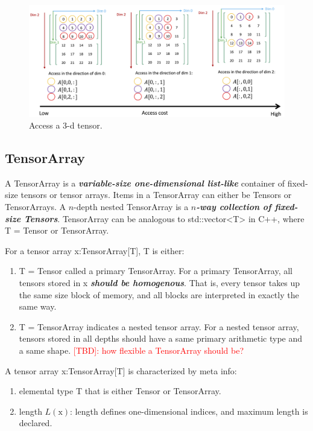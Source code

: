\begin{figure}[htbp]
\centering
\includegraphics[width=1.\textwidth]{images/tensor.png}
\caption{Access a 3-d tensor.}
\label{fig1}
\end{figure}

\subsection{TensorArray}

A TensorArray is a \textbf{\textit{variable-size one-dimensional list-like}} container of fixed-size tensors or tensor arrays. Items in a TensorArray can either be Tensors or TensorArrays. A $n$-depth nested TensorArray is a \textbf{\textit{$n$-way collection of fixed-size Tensors}}. TensorArray can be analogous to std::vector<T> in C++, where T = Tensor or TensorArray.

For a tensor array x:TensorArray[T], T is either:

\begin{enumerate}
  \item T = Tensor called a primary TensorArray. For a primary TensorArray, all tensors stored in x \textbf{\textit{should be homogenous}}. That is, every tensor takes up the same size block of memory, and all blocks are interpreted in exactly the same way.
  \item T = TensorArray indicates a nested tensor array. For a nested tensor array, tensors stored in all depths should have a same primary arithmetic type and a same shape. \textcolor{red}{[TBD]: how flexible a TensorArray should be?}
\end{enumerate}

A tensor array x:TensorArray[T] is characterized by meta info:
\begin{enumerate}
  \item elemental type T that is either Tensor or TensorArray.
  \item length $L(\text{x})$: length defines one-dimensional indices, and maximum length is declared.
\end{enumerate}

